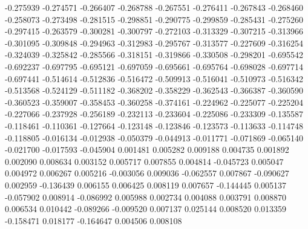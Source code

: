 -0.275939
-0.274571
-0.266407
-0.268788
-0.267551
-0.276411
-0.267843
-0.268460
-0.258073
-0.273498
-0.281515
-0.298851
-0.290775
-0.299859
-0.285431
-0.275260
-0.297415
-0.263579
-0.300281
-0.300797
-0.272103
-0.313329
-0.307215
-0.313966
-0.301095
-0.309848
-0.294963
-0.312983
-0.295767
-0.313577
-0.227609
-0.316254
-0.324039
-0.325842
-0.285566
-0.318151
-0.319866
-0.330508
-0.298201
-0.695542
-0.692237
-0.697795
-0.695121
-0.697059
-0.695661
-0.695764
-0.698028
-0.697714
-0.697441
-0.514614
-0.512836
-0.516472
-0.509913
-0.516041
-0.510973
-0.516342
-0.513568
-0.524129
-0.511182
-0.368202
-0.358229
-0.362543
-0.366387
-0.360590
-0.360523
-0.359007
-0.358453
-0.360258
-0.374161
-0.224962
-0.225077
-0.225204
-0.227066
-0.237928
-0.256189
-0.232113
-0.233604
-0.225086
-0.233309
-0.135587
-0.118461
-0.110361
-0.127664
-0.123148
-0.123846
-0.123573
-0.113633
-0.114748
-0.118805
-0.016134
-0.012938
-0.050379
-0.044913
-0.011771
-0.071869
-0.065140
-0.021700
-0.017593
-0.045904
0.001481
0.005282
0.009188
0.004735
0.001892
0.002090
0.008634
0.003152
0.005717
0.007855
0.004814
-0.045723
0.005047
0.004972
0.006267
0.005216
-0.003056
0.009036
-0.062557
0.007867
-0.090627
0.002959
-0.136439
0.006155
0.006425
0.008119
0.007657
-0.144445
0.005137
-0.057902
0.008914
-0.086992
0.005988
0.002734
0.004088
0.003791
0.008870
0.006534
0.010442
-0.089266
-0.009520
0.007137
0.025144
0.008520
0.013359
-0.158471
0.018177
-0.164647
0.004506
0.008108
